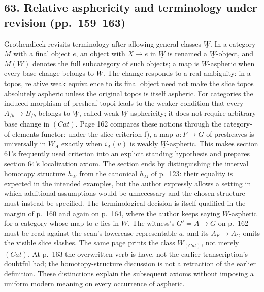 \subsection*{63. Relative asphericity and terminology under revision (pp.~159--163)}
Grothendieck revisits terminology after allowing general classes $\underline W$. In a category $M$ with a final object $e$, an object with $X\to e$ in $\underline W$ is renamed a $\underline W$-object, and $M(\underline W)$ denotes the full subcategory of such objects; a map is $\underline W$-aspheric when every base change belongs to $\underline W$. The change responds to a real ambiguity: in a topos, relative weak equivalence to its final object need not make the slice topos absolutely aspheric unless the original topos is itself aspheric. For categories the induced morphism of presheaf topoi leads to the weaker condition that every $A_{/b}\to B_{/b}$ belongs to $\underline W$, called weak $\underline W$-asphericity; it does not require arbitrary base change in $(Cat)$. Page 162 compares these notions through the category-of-elements functor: under the slice criterion f), a map $u:F\to G$ of presheaves is universally in $W_A$ exactly when $i_A(u)$ is weakly $\underline W$-aspheric. This makes section 61's frequently used criterion into an explicit standing hypothesis and prepares section 64's localization axiom. The section ends by distinguishing the interval homotopy structure $h_W$ from the canonical $h_M$ of p.~123: their equality is expected in the intended examples, but the author expressly allows a setting in which additional assumptions would be unnecessary and the chosen structure must instead be specified. The terminological decision is itself qualified in the margin of p.~160 and again on p.~164, where the author keeps saying $\underline W$-aspheric for a category whose map to $e$ lies in $\underline W$. The witness's $G'=A\to G$ on p.~162 must be read against the scan's lowercase representable $a$, and its $A_F\to A_G$ omits the visible slice slashes. The same page prints the class $W_{(Cat)}$, not merely $(Cat)$. At p.~163 the overwritten verb is have, not the earlier transcription's doubtful had; the homotopy-structure discussion is not a retraction of the earlier definition. These distinctions explain the subsequent axioms without imposing a uniform modern meaning on every occurrence of aspheric.


